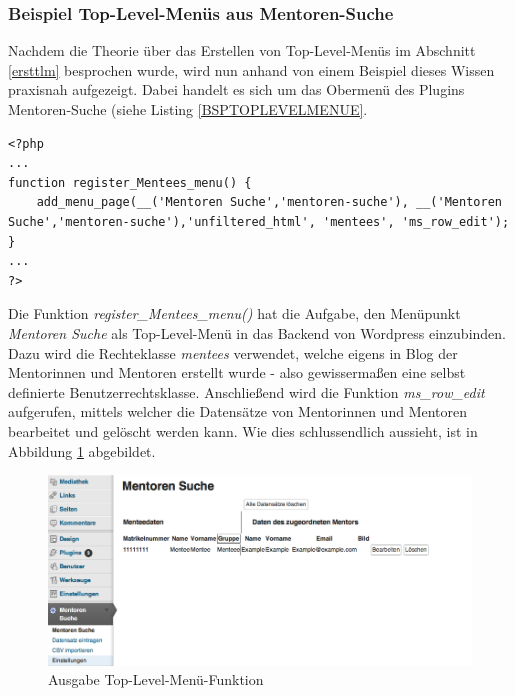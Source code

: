 \subsubsection{Beispiel Top-Level-Menüs aus Mentoren-Suche}\label{bsptlm}
Nachdem die Theorie über das Erstellen von Top-Level-Menüs im Abschnitt \ref{ersttlm} besprochen wurde, wird nun anhand von einem Beispiel dieses Wissen praxisnah aufgezeigt. Dabei handelt es sich um das Obermenü des Plugins Mentoren-Suche (siehe Listing \ref{BSPTOPLEVELMENUE}.\newline
{}
\begin{lstlisting}
<?php 
...
function register_Mentees_menu() {
	add_menu_page(__('Mentoren Suche','mentoren-suche'), __('Mentoren Suche','mentoren-suche'),'unfiltered_html', 'mentees', 'ms_row_edit');
}
...
?>
\end{lstlisting}
Die Funktion \emph{register\_Mentees\_menu()} hat die Aufgabe, den Menüpunkt \emph{Mentoren Suche} als Top-Level-Menü in das Backend von Wordpress einzubinden. Dazu wird die Rechteklasse \emph{mentees} verwendet, welche eigens in Blog der Mentorinnen und Mentoren erstellt wurde - also gewissermaßen eine selbst definierte Benutzerrechtsklasse. Anschließend wird die Funktion \emph{ms\_row\_edit} aufgerufen, mittels welcher die Datensätze von Mentorinnen und Mentoren bearbeitet und gelöscht werden kann. Wie dies schlussendlich aussieht, ist in Abbildung \ref{img:ausgtlmfunk} abgebildet.
  \begin{figure}[htbp]
	\begin{center}
		\includegraphics[angle={360}, scale=0.50]{pictures/mentsuchergmenue.png}
	    \caption{Ausgabe Top-Level-Menü-Funktion}
	    \label{img:ausgtlmfunk}
	    	\end{center}
   \end{figure}
